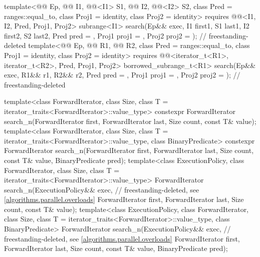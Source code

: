\begin{codeblock}
{{    template<@@ Ep, @@ I1, @@<I1> S1,
             @@ I2, @@<I2> S2,
             class Pred = ranges::equal_to, class Proj1 = identity, class Proj2 = identity>
      requires @@<I1, I2, Pred, Proj1, Proj2>
      subrange<I1>
        search(Ep&& exec, I1 first1, S1 last1, I2 first2, S2 last2,
               Pred pred = {}, Proj1 proj1 = {}, Proj2 proj2 = {});         // freestanding-deleted
    template<@@ Ep, @@ R1, @@ R2,
             class Pred = ranges::equal_to, class Proj1 = identity, class Proj2 = identity>
      requires @@<iterator_t<R1>, iterator_t<R2>, Pred, Proj1, Proj2>
      borrowed_subrange_t<R1>
        search(Ep&& exec, R1&& r1, R2&& r2,
               Pred pred = {}, Proj1 proj1 = {}, Proj2 proj2 = {});         // freestanding-deleted
  }

  template<class ForwardIterator, class Size,
           class T = iterator_traits<ForwardIterator>::value_type>
    constexpr ForwardIterator
      search_n(ForwardIterator first, ForwardIterator last,
               Size count, const T& value);
  template<class ForwardIterator, class Size,
           class T = iterator_traits<ForwardIterator>::value_type, class BinaryPredicate>
    constexpr ForwardIterator
      search_n(ForwardIterator first, ForwardIterator last,
               Size count, const T& value, BinaryPredicate pred);
  template<class ExecutionPolicy, class ForwardIterator, class Size,
           class T = iterator_traits<ForwardIterator>::value_type>
    ForwardIterator
      search_n(ExecutionPolicy&& exec,                          // freestanding-deleted, see \ref{algorithms.parallel.overloads}
               ForwardIterator first, ForwardIterator last,
               Size count, const T& value);
  template<class ExecutionPolicy, class ForwardIterator, class Size,
           class T = iterator_traits<ForwardIterator>::value_type, class BinaryPredicate>
    ForwardIterator
      search_n(ExecutionPolicy&& exec,                          // freestanding-deleted, see \ref{algorithms.parallel.overloads}
               ForwardIterator first, ForwardIterator last,
               Size count, const T& value,
               BinaryPredicate pred);

}
\end{codeblock}
